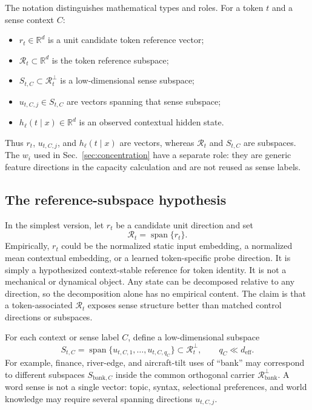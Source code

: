\documentclass[
  aps,
  reprint,
  superscriptaddress,
  floatfix,
  nofootinbib,
  longbibliography
]{revtex4-2}
\newcommand{\R}{\mathbb{R}}
\newcommand{\deff}{d_{\mathrm{eff}}}
\DeclareMathOperator{\spanop}{span}
\begin{document}
The notation distinguishes mathematical types and roles. For a token $t$
and a sense context $C$:
%
\begin{itemize}
\item $r_t\in\R^d$ is a unit candidate token reference vector;
\item $\mathcal R_t\subset\R^d$ is the token reference subspace;
\item $S_{t,C}\subset\mathcal R_t^\perp$ is a low-dimensional sense
subspace;
\item $u_{t,C,j}\in S_{t,C}$ are vectors spanning that sense subspace;
\item $h_\ell(t\mid x)\in\R^d$ is an observed contextual hidden state.
\end{itemize}
%
Thus $r_t$, $u_{t,C,j}$, and $h_\ell(t\mid x)$ are vectors, whereas
$\mathcal R_t$ and $S_{t,C}$ are subspaces. The $w_i$ used in
Sec.~\ref{sec:concentration} have a separate role: they are generic feature
directions in the capacity calculation and are not reused as sense labels.

\subsection{The reference-subspace hypothesis}
\label{sec:reference-hypothesis}

In the simplest version, let $r_t$ be a candidate unit direction and set
%
\begin{equation}
\label{eq:reference-direction}
\mathcal R_t=\spanop\{r_t\}.
\end{equation}
%
Empirically, $r_t$ could be the normalized static input embedding, a
normalized mean contextual embedding, or a learned token-specific probe
direction. It is simply a hypothesized context-stable reference for token
identity. It is not a mechanical or dynamical object.
Any state can be decomposed relative to any direction, so the decomposition
alone has no empirical content. The claim is that a token-associated
$\mathcal R_t$ exposes sense structure better than matched control
directions or subspaces.

For each context or sense label $C$, define a low-dimensional subspace
%
\begin{equation}
\label{eq:sense-subspace}
S_{t,C}=\spanop\{u_{t,C,1},\dots,u_{t,C,q_C}\}
\subset\mathcal R_t^\perp,
\qquad q_C\ll\deff .
\end{equation}
%
For example, finance, river-edge, and aircraft-tilt uses of ``bank'' may
correspond to different subspaces $S_{\mathrm{bank},C}$ inside the common
orthogonal carrier $\mathcal R_{\mathrm{bank}}^\perp$. A word sense is not
a single vector: topic, syntax, selectional preferences, and world knowledge
may require several spanning directions $u_{t,C,j}$.
\end{document}
